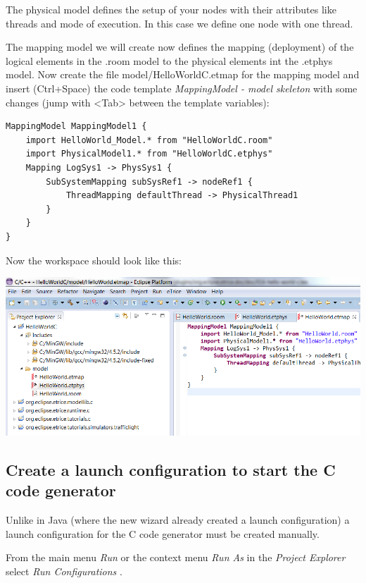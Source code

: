 The physical model defines the setup of your nodes with their attributes like threads and mode of execution. In this case we define one node with one thread. 

The mapping model we will create now defines the mapping (deployment) of the logical elements in the .room model to the physical elements int the .etphys model. Now create the file model/HelloWorldC.etmap for the mapping model and insert (Ctrl+Space) the code template \emph{MappingModel - model skeleton} with some changes (jump with <Tab> between the template variables):

\begin{lstlisting}[language=etMap]
MappingModel MappingModel1 {
	import HelloWorld_Model.* from "HelloWorldC.room"
	import PhysicalModel1.* from "HelloWorldC.etphys"
	Mapping LogSys1 -> PhysSys1 {
		SubSystemMapping subSysRef1 -> nodeRef1 {
			ThreadMapping defaultThread -> PhysicalThread1
		}
	}
}
\end{lstlisting}

Now the workspace should look like this:

\includegraphics{images/016-HelloWorldC05.png}



\subsection{Create a launch configuration to start the C code generator}

Unlike in Java (where the new wizard already created a launch configuration)
a launch configuration for the C code generator must be created manually.

From the main menu \textit{Run} or the context menu \textit{Run As} in the \emph{Project Explorer} select \textit{Run Configurations} .

